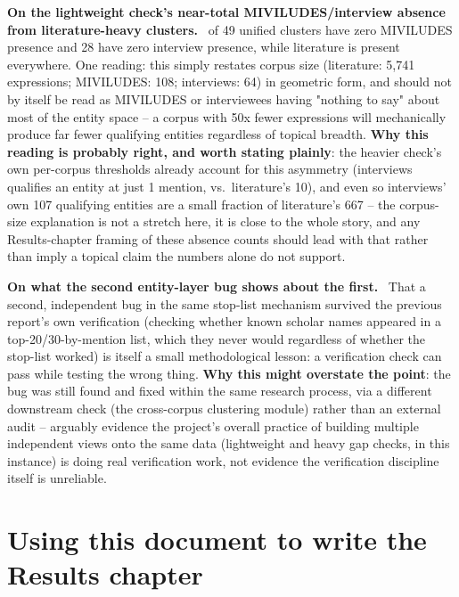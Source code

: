 \documentclass[11pt,a4paper]{article}
\newenvironment{interpbox}[1][Possible interpretation]
  {\par\vspace{6pt}\noindent{\color{interpline}\rule{\linewidth}{0.8pt}}\par\vspace{3pt}
   \noindent\small\textcolor{interpline}{\textbf{#1.}}\ \ignorespaces}
  {\par\vspace{3pt}\noindent{\color{interpline}\rule{\linewidth}{0.8pt}}\vspace{6pt}\par}
\begin{document}
\begin{interpbox}[On the lightweight check's near-total MIVILUDES/interview absence from literature-heavy clusters]
40 of 49 unified clusters have zero MIVILUDES presence and 28 have zero
interview presence, while literature is present everywhere. One
reading: this simply restates corpus size (literature: 5,741
expressions; MIVILUDES: 108; interviews: 64) in geometric form, and
should not by itself be read as MIVILUDES or interviewees having
"nothing to say" about most of the entity space -- a corpus with 50x
fewer expressions will mechanically produce far fewer qualifying
entities regardless of topical breadth. \textbf{Why this reading is
probably right, and worth stating plainly}: the heavier check's own
per-corpus thresholds already account for this asymmetry (interviews
qualifies an entity at just 1 mention, vs.\ literature's 10), and even
so interviews' own 107 qualifying entities are a small fraction of
literature's 667 -- the corpus-size explanation is not a stretch here,
it is close to the whole story, and any Results-chapter framing of these
absence counts should lead with that rather than imply a topical claim
the numbers alone do not support.
\end{interpbox}

\begin{interpbox}[On what the second entity-layer bug shows about the first]
That a second, independent bug in the same stop-list mechanism survived
the previous report's own verification (checking whether known scholar
names appeared in a top-20/30-by-mention list, which they never would
regardless of whether the stop-list worked) is itself a small
methodological lesson: a verification check can pass while testing the
wrong thing. \textbf{Why this might overstate the point}: the bug was
still found and fixed within the same research process, via a different
downstream check (the cross-corpus clustering module) rather than an
external audit -- arguably evidence the project's overall practice of
building multiple independent views onto the same data (lightweight and
heavy gap checks, in this instance) is doing real verification work,
not evidence the verification discipline itself is unreliable.
\end{interpbox}

\section{Using this document to write the Results chapter}
\end{document}
